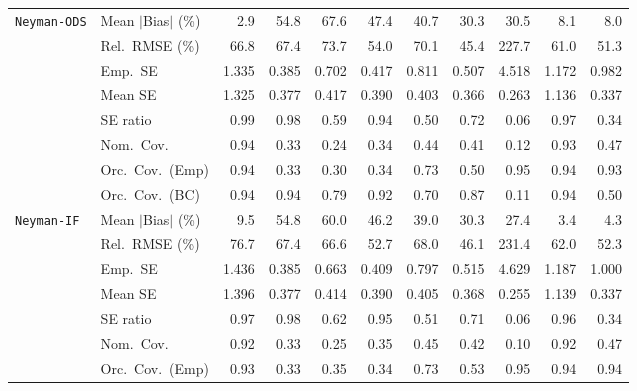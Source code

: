 \begin{landscape}
\begin{longtable}{llrrrrrrrrr}
\addlinespace[2pt]
\quad \texttt{Neyman-ODS} & Mean $|$Bias$|$ (\%) & \cellcolor{rankone}2.9 & 54.8 & 67.6 & 47.4 & 40.7 & 30.3 & 30.5 & \cellcolor{rankthree}8.1 & \cellcolor{ranktwo}8.0 \\
 & Rel.\ RMSE (\%) & 66.8 & 67.4 & 73.7 & \cellcolor{rankthree}54.0 & 70.1 & \cellcolor{rankone}45.4 & 227.7 & 61.0 & \cellcolor{ranktwo}51.3 \\
 & Emp.\ SE & 1.335 & 0.385 & 0.702 & 0.417 & 0.811 & 0.507 & 4.518 & 1.172 & 0.982 \\
 & Mean SE & 1.325 & 0.377 & 0.417 & 0.390 & 0.403 & 0.366 & 0.263 & 1.136 & 0.337 \\
 & SE ratio & \cellcolor{rankone}0.99 & \cellcolor{ranktwo}0.98 & 0.59 & 0.94 & 0.50 & 0.72 & 0.06 & \cellcolor{rankthree}0.97 & 0.34 \\
 & Nom.\ Cov. & \cellcolor{rankone}0.94 & 0.33 & 0.24 & 0.34 & 0.44 & 0.41 & 0.12 & \cellcolor{ranktwo}0.93 & \cellcolor{rankthree}0.47 \\
 & Orc.\ Cov.\ (Emp) & \cellcolor{ranktwo}0.94 & 0.33 & 0.30 & 0.34 & 0.73 & 0.50 & \cellcolor{rankone}0.95 & \cellcolor{ranktwo}0.94 & \cellcolor{rankthree}0.93 \\
 & Orc.\ Cov.\ (BC) & \cellcolor{rankone}0.94 & \cellcolor{rankone}0.94 & 0.79 & \cellcolor{ranktwo}0.92 & 0.70 & \cellcolor{rankthree}0.87 & 0.11 & \cellcolor{rankone}0.94 & 0.50 \\
\addlinespace[2pt]
\quad \texttt{Neyman-IF} & Mean $|$Bias$|$ (\%) & \cellcolor{rankthree}9.5 & 54.8 & 60.0 & 46.2 & 39.0 & 30.3 & 27.4 & \cellcolor{rankone}3.4 & \cellcolor{ranktwo}4.3 \\
 & Rel.\ RMSE (\%) & 76.7 & 67.4 & 66.6 & \cellcolor{rankthree}52.7 & 68.0 & \cellcolor{rankone}46.1 & 231.4 & 62.0 & \cellcolor{ranktwo}52.3 \\
 & Emp.\ SE & 1.436 & 0.385 & 0.663 & 0.409 & 0.797 & 0.515 & 4.629 & 1.187 & 1.000 \\
 & Mean SE & 1.396 & 0.377 & 0.414 & 0.390 & 0.405 & 0.368 & 0.255 & 1.139 & 0.337 \\
 & SE ratio & \cellcolor{ranktwo}0.97 & \cellcolor{rankone}0.98 & 0.62 & 0.95 & 0.51 & 0.71 & 0.06 & \cellcolor{rankthree}0.96 & 0.34 \\
 & Nom.\ Cov. & \cellcolor{rankone}0.92 & 0.33 & 0.25 & 0.35 & \cellcolor{rankthree}0.45 & 0.42 & 0.10 & \cellcolor{rankone}0.92 & \cellcolor{ranktwo}0.47 \\
 & Orc.\ Cov.\ (Emp) & \cellcolor{rankthree}0.93 & 0.33 & 0.35 & 0.34 & 0.73 & 0.53 & \cellcolor{rankone}0.95 & \cellcolor{ranktwo}0.94 & \cellcolor{ranktwo}0.94 \\

\end{longtable}
\end{landscape}
